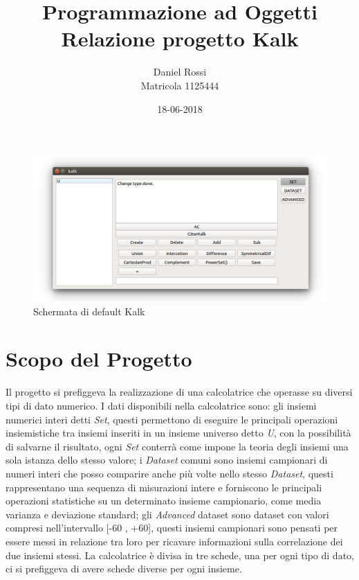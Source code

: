 \documentclass[a4paper,10pt]{article}
\begin{document}
	
	\title{Programmazione ad Oggetti\\Relazione progetto Kalk}
	\author{Daniel Rossi\\Matricola 1125444}
	\date{18-06-2018}
	\maketitle
	\begin{figure}[!h]
		\includegraphics[scale=0.5]{img/kalk.jpg}
			\caption{Schermata di default Kalk}
    \end{figure}
    \newpage
	\tableofcontents
	\newpage
	
    \section{Scopo del Progetto}
    Il progetto si prefiggeva la realizzazione di una calcolatrice che operasse su diversi tipi di dato numerico. I dati disponibili nella calcolatrice sono: gli insiemi numerici interi detti \textit{Set}, questi permettono di eseguire le principali operazioni insiemistiche tra insiemi inseriti in un insieme universo detto \textit{U}, con la possibilità di salvarne il risultato, ogni \textit{Set} conterrà come impone la teoria degli insiemi una sola istanza dello stesso valore; i \textit{Dataset} comuni sono insiemi campionari di numeri interi che posso comparire anche più volte nello stesso \textit{Dataset}, questi rappresentano una sequenza di misurazioni intere e forniscono le principali operazioni statistiche su un determinato insieme campionario, come media varianza e deviazione standard; gli \textit{Advanced} dataset sono dataset con valori compresi nell’intervallo [-60 , +60], questi insiemi campionari sono pensati per essere messi in relazione tra loro per ricavare informazioni sulla correlazione dei due insiemi stessi. La calcolatrice è divisa in tre schede, una per ogni tipo di dato, ci si prefiggeva di avere schede diverse per ogni insieme.
\end{document}
